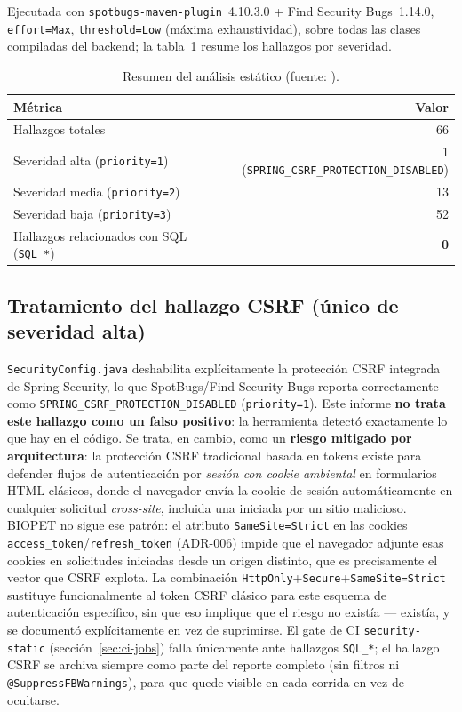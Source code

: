 Ejecutada con \texttt{spotbugs-maven-plugin}~4.10.3.0 + Find Security
Bugs~1.14.0, \texttt{effort=Max}, \texttt{threshold=Low} (m\'axima
exhaustividad), sobre todas las clases compiladas del backend; la
tabla~\ref{tab:spotbugs-final} resume los hallazgos por severidad.

\begin{table}[H]
  \centering
  \caption[Resumen del an\'alisis est\'atico (SpotBugs).]{Resumen del an\'alisis est\'atico (fuente: ).}
  \label{tab:spotbugs-final}
  \begin{tabular}{@{}lr@{}}
    \toprule
    M\'etrica & Valor \\
    \midrule
    Hallazgos totales & 66 \\
    Severidad alta (\texttt{priority=1}) & 1 (\texttt{SPRING\_CSRF\_PROTECTION\_DISABLED}) \\
    Severidad media (\texttt{priority=2}) & 13 \\
    Severidad baja (\texttt{priority=3}) & 52 \\
    Hallazgos relacionados con SQL (\texttt{SQL\_*}) & \textbf{0} \\
    \bottomrule
  \end{tabular}
\end{table}

\subsection*{Tratamiento del hallazgo CSRF (\'unico de severidad alta)}
\label{sec:csrf}

\texttt{SecurityConfig.java} deshabilita expl\'icitamente la protecci\'on
CSRF integrada de Spring Security, lo que SpotBugs/Find Security Bugs
reporta correctamente como \texttt{SPRING\_CSRF\_PROTECTION\_DISABLED}
(\texttt{priority=1}). Este informe \textbf{no trata este hallazgo como un
falso positivo}: la herramienta detect\'o exactamente lo que hay en el
c\'odigo. Se trata, en cambio, como un \textbf{riesgo mitigado por
arquitectura}: la protecci\'on CSRF tradicional basada en tokens existe
para defender flujos de autenticaci\'on por \emph{sesi\'on con cookie
ambiental} en formularios HTML cl\'asicos, donde el navegador env\'ia la
cookie de sesi\'on autom\'aticamente en cualquier solicitud
\emph{cross-site}, incluida una iniciada por un sitio malicioso. BIOPET no
sigue ese patr\'on: el atributo \texttt{SameSite=Strict} en las cookies
\texttt{access\_token}/\texttt{refresh\_token} (ADR-006) impide que el
navegador adjunte esas cookies en solicitudes iniciadas desde un origen
distinto, que es precisamente el vector que CSRF explota. La combinaci\'on
\texttt{HttpOnly}+\texttt{Secure}+\texttt{SameSite=Strict} sustituye
funcionalmente al token CSRF cl\'asico para este esquema de autenticaci\'on
espec\'ifico, sin que eso implique que el riesgo no exist\'ia --- exist\'ia,
y se document\'o expl\'icitamente en vez de suprimirse. El gate de CI
\texttt{security-static} (secci\'on~\ref{sec:ci-jobs}) falla \'unicamente
ante hallazgos \texttt{SQL\_*}; el hallazgo CSRF se archiva siempre como
parte del reporte completo (sin filtros ni \texttt{@SuppressFBWarnings}),
para que quede visible en cada corrida en vez de ocultarse.

